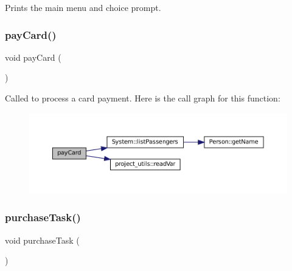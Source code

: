 Prints the main menu and choice prompt. 

\mbox{\label{Train-System_8cpp_a0fad85a1b7ab8e584b507f108d2dd6cf}} 
\subsubsection{\texorpdfstring{pay\+Card()}{payCard()}}
{\footnotesize\ttfamily void pay\+Card (\begin{DoxyParamCaption}{ }\end{DoxyParamCaption})}

Called to process a card payment. Here is the call graph for this function\+:
\nopagebreak
\begin{figure}[H]
\begin{center}
\leavevmode
\includegraphics[width=350pt]{Train-System_8cpp_a0fad85a1b7ab8e584b507f108d2dd6cf_cgraph}
\end{center}
\end{figure}
\mbox{\label{Train-System_8cpp_a94e2f63ee8229943a5825715b3fe6843}} 
\subsubsection{\texorpdfstring{purchase\+Task()}{purchaseTask()}}
{\footnotesize\ttfamily void purchase\+Task (\begin{DoxyParamCaption}{ }\end{DoxyParamCaption})}

